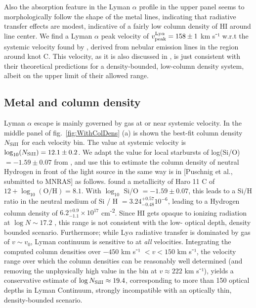 \documentclass[twocolumn]{aastex61}
\begin{document}
Also the absorption feature in the Lyman $\alpha$ profile in the upper
panel seems to morphologically follow the shape of the metal lines,
indicating that radiative transfer effects are modest, indicative of a
fairly low column density of HI around line center. We find a Lyman
$\alpha$ peak velocity of $v_{\rm peak}^{\mathrm{Ly}\alpha} = 158 \pm 1$
km s⁻¹ w.r.t the systemic velocity found by \citet{Sandberg2013},
derived from nebular emission lines in the region around knot C. This
velocity, as it is also discussed in \citet{Verhamme2015}, is just
consistent with their theoretical predictions for a density-bounded,
low-column density system, albeit on the upper limit of their allowed
range.

\subsection{Metal and  column
density}\label{metal-and-column-density}

Lyman $\alpha$ escape is mainly governed by gas at or near systemic
velocity. In the middle panel of fig.~\ref{fig:WithColDens} (a) is shown
the best-fit column density $N_{\rm Si II}$ for each velocity bin. The
value at systemic velocity is $\log_{10}(N_{\rm Si II}) = 12.1 \pm 0.2$.
We adapt the value for local starbursts of log(Si/O) $= -1.59 \pm 0.07$
from \citet{Garnett1995}, and use this to estimate the column density of
neutral Hydrogen in front of the light source in the same way is in
{[}Puschnig et al., submitted to MNRAS{]} as follows. \citet{Guseva2012}
found a metallicity of Haro 11 C of $12 + \log_{10}(\text{O/H}) = 8.1$.
With $\log_{10}$ Si/O $= -1.59 \pm 0.07$, this leads to a Si/H ratio in
the neutral medium of Si / H $= 3.24^{+0.57}_{-0.48} 10^{-6}$, leading
to a Hydrogen column density of $6.2^{+0.9}_{-1.1} \times 10^{17}$
cm\textsuperscript{-2}. Since HI gets opaque to ionizing radiation at
$\log N \sim 17.2$ \citep{Verhamme2015}, this range is not consistent
with the low- optical depth, density bounded scenario. Furthermore;
while Ly$\alpha$ radiative transfer is dominated by gas of $v \sim v_0$,
Lyman continuum is sensitive to  at \emph{all} velocities.
Integrating the computed column densities over $-450$ km s⁻¹ $< v < 150$
km s⁻¹, the velocity range over which the column densities can be
reasonably well determined (and removing the unphysically high value in
the bin at $v \approx 222$ km s⁻¹), yields a conservative estimate of
$\log N_{\rm Si II} \approx 19.4$, corresponding to more than 150
optical depths in Lyman Continuum, strongly incompatible with an
optically thin, density-bounded scenario.
\end{document}
